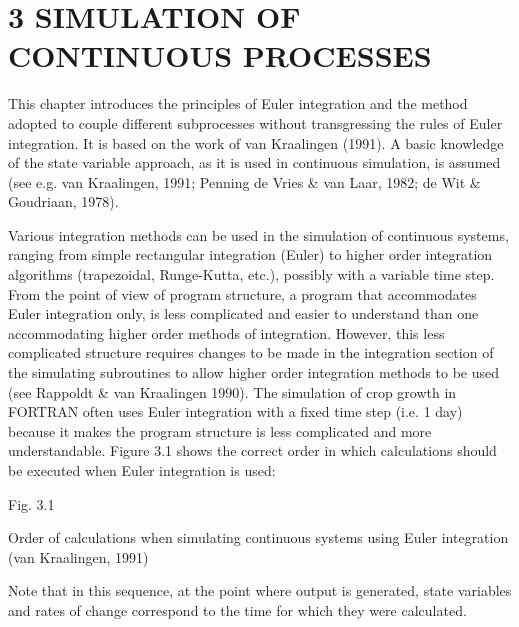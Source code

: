 \section{  3 SIMULATION OF CONTINUOUS PROCESSES  }

\bigskip
\bigskip
This chapter introduces the principles of Euler integration and the method adopted to
couple different subprocesses without transgressing the rules of Euler integration. It is
based on the work of van Kraalingen (1991). A basic knowledge of the state variable
approach, as it is used in continuous simula\-tion, is assumed (see e.g. van Kraalingen,
1991; Penning de Vries \& van Laar, 1982; de Wit \& Goudriaan, 1978).

\bigskip
Various integration methods can be used in the simulation of continuous systems, ranging
from simple rectangular integration (Euler) to higher order integration algorithms (trap\-ezoidal, Runge-Kutta, etc.), possibly with a variable time step. From the point of view of
program structure, a program that accommodates Euler integra\-tion only, is less compli\-cated and easier to understand than one accommodating higher order methods of integra\-tion. However, this less complicated structure requires changes to be made in the
integration section of the simulating subroutines to allow higher order integration methods
to be used (see Rappoldt \& van Kraalin\-gen 1990). The simulation of crop growth in
FORTRAN often uses Euler integration with a fixed time step (i.e. 1 day) because it
makes the program structure is less complicated and more understandable. Figure 3.1
shows the correct order in which calculations should be executed when Euler integration
is used:

\begin{figure}[htbp]
 \begin{center} \end{center}
\end{figure}

\bigskip
\bigskip
\bigskip
\bigskip
\bigskip
\bigskip
\bigskip
\bigskip
\bigskip
\bigskip
\bigskip
\bigskip
\bigskip
\bigskip
Fig. 3.1
\testlastline

\begin{indenting}{2.54cm}
Order of calcu\-lations when simulat\-ing con\-tinuous systems using Euler inte\-gra\-tion (van Kraalingen, 1991)
\end{indenting}

 \bigskip
Note that in this sequence, at the point where output is generated, state variables and rates
of change correspond to the time for which they were calculated. 

